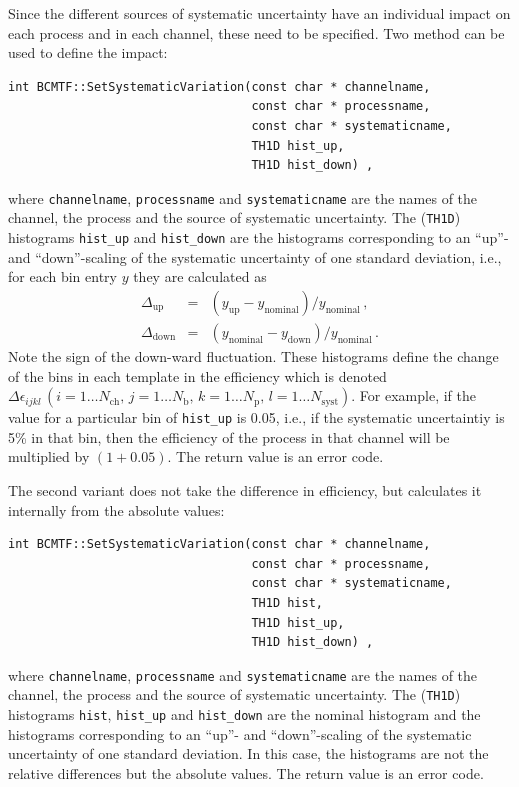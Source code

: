 \documentclass[11pt, a4paper]{article}
\begin{document}
Since the different sources of systematic uncertainty have an
individual impact on each process and in each channel, these need to
be specified. Two method can be used to define the impact:
%
\begin{verbatim}
int BCMTF::SetSystematicVariation(const char * channelname,
                                  const char * processname,
                                  const char * systematicname,
                                  TH1D hist_up,
                                  TH1D hist_down) ,
\end{verbatim}
%
where \verb|channelname|, \verb|processname| and \verb|systematicname|
are the names of the channel, the process and the source of systematic
uncertainty. The (\verb|TH1D|) histograms \verb|hist_up| and
\verb|hist_down| are the histograms corresponding to an ``up''- and
``down''-scaling of the systematic uncertainty of one standard
deviation, i.e., for each bin entry $y$ they are calculated as
%
\begin{eqnarray}
\label{eqn:deltay}
\Delta_{\mathrm{up}}   & = & (y_{\mathrm{up}} - y_{\mathrm{nominal}})/y_{\mathrm{nominal}} \, , \\
\Delta_{\mathrm{down}} & = & (y_{\mathrm{nominal}} - y_{\mathrm{down}})/y_{\mathrm{nominal}} \, .
\end{eqnarray}
%
Note the sign of the down-ward fluctuation. These histograms define
the change of the bins in each template in the efficiency which is
denoted $\Delta\epsilon_{ijkl} \, (i=1\dots N_{\mathrm{ch}}, \,
j=1\dots N_{\mathrm{b}}, \, k=1\dots N_{\mathrm{p}}, \, l=1\dots
N_{\mathrm{syst}})$. For example, if the value for a particular bin of
\verb|hist_up| is 0.05, i.e., if the systematic uncertaintiy is 5\% in
that bin, then the efficiency of the process in that channel will be
multiplied by $(1+0.05)$. The return value is an error code.

The second variant does not take the difference in efficiency, but
calculates it internally from the absolute values:
%
\begin{verbatim}
int BCMTF::SetSystematicVariation(const char * channelname,
                                  const char * processname,
                                  const char * systematicname,
                                  TH1D hist,
                                  TH1D hist_up,
                                  TH1D hist_down) ,
\end{verbatim}
%
where \verb|channelname|, \verb|processname| and \verb|systematicname|
are the names of the channel, the process and the source of systematic
uncertainty. The (\verb|TH1D|) histograms \verb|hist|, \verb|hist_up|
and \verb|hist_down| are the nominal histogram and the histograms
corresponding to an ``up''- and ``down''-scaling of the systematic
uncertainty of one standard deviation. In this case, the histograms
are not the relative differences but the absolute values. The return
value is an error code.
\end{document}
